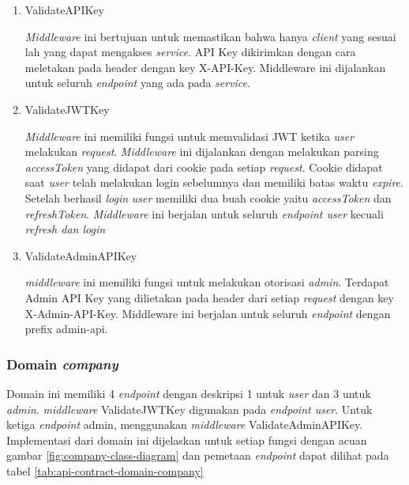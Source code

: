 \begin{enumerate}
    \item ValidateAPIKey

          \textit{Middleware} ini bertujuan untuk memastikan bahwa hanya \textit{client} yang sesuai lah yang dapat mengakses \textit{service}. API Key dikirimkan dengan cara meletakan pada header dengan key X-API-Key. Middleware ini dijalankan untuk seluruh \textit{endpoint} yang ada pada \textit{service}.

    \item ValidateJWTKey

          \textit{Middleware} ini memiliki fungsi untuk memvalidasi JWT ketika \textit{user} melakukan \textit{request}. \textit{Middleware} ini dijalankan dengan melakukan parsing \textit{accessToken} yang didapat dari cookie pada setiap \textit{request}. Cookie didapat saat \textit{user} telah melakukan login sebelumnya dan memiliki batas waktu \textit{expire}. Setelah berhasil \textit{login} \textit{user} memiliki dua buah cookie yaitu \textit{accessToken} dan \textit{refreshToken}.  \textit{Middleware} ini berjalan untuk seluruh \textit{endpoint user} kecuali \textit{refresh dan login}


    \item ValidateAdminAPIKey

          \textit{middleware} ini memiliki fungsi untuk melakukan otorisasi \textit{admin}. Terdapat Admin API Key yang dilietakan pada header dari setiap \textit{request} dengan key X-Admin-API-Key. Middleware ini berjalan untuk seluruh \textit{endpoint} dengan prefix admin-api.
\end{enumerate}


\subsubsection{Domain \textit{company}}

Domain ini memiliki 4 \textit{endpoint} dengan deskripsi 1 untuk \textit{user} dan 3 untuk \textit{admin}. \textit{middleware} ValidateJWTKey digunakan pada \textit{endpoint user}. Untuk ketiga \textit{endpoint} admin, menggunakan \textit{middleware} ValidateAdminAPIKey. Implementasi dari domain ini dijelaskan untuk setiap fungsi dengan acuan gambar \ref{fig:company-class-diagram} dan pemetaan \textit{endpoint} dapat dilihat pada tabel \ref{tab:api-contract-domain-company}


